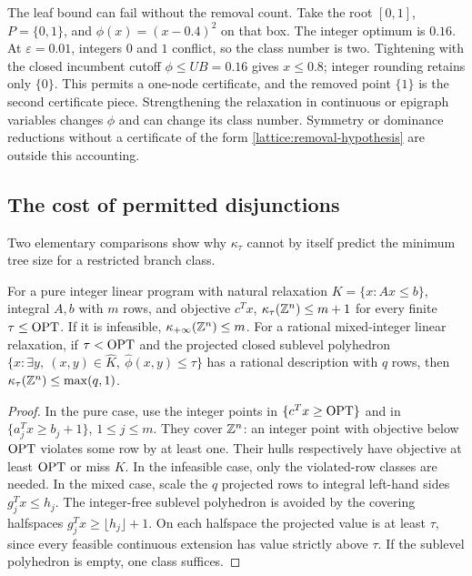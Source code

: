 The leaf bound can fail without the removal count. Take the root
$[0,1]$, $P=\{0,1\}$, and $\phi(x)=(x-0.4)^2$ on that box. The integer
optimum is $0.16$. At $\varepsilon=0.01$, integers $0$ and $1$ conflict,
so the class number is two. Tightening with the closed incumbent cutoff
$\phi\le UB=0.16$ gives $x\le0.8$; integer rounding retains only
$\{0\}$. This permits a one-node certificate, and the removed point
$\{1\}$ is the second certificate piece. Strengthening the relaxation in continuous or epigraph
variables changes $\phi$ and can change its class number. Symmetry or
dominance reductions without a certificate of the form
\eqref{lattice:removal-hypothesis} are outside this accounting.

\subsection{The cost of permitted disjunctions}

Two elementary comparisons show why $\kappa_\tau$ cannot by itself predict
the minimum tree size for a restricted branch class.

\begin{proposition}
\label{lattice:linear}
For a pure integer linear program with natural relaxation
$K=\{x:Ax\le b\}$, integral $A,b$ with $m$ rows, and objective $c^Tx$,
$\kappa_\tau(\mathbb{Z}^n)\le m+1$ for every finite $\tau\le\operatorname{OPT}$. If it is
infeasible, $\kappa_{+\infty}(\mathbb{Z}^n)\le m$. For a rational mixed-integer
linear relaxation, if $\tau<\operatorname{OPT}$ and the projected closed sublevel
polyhedron $\{x:\exists y,\ (x,y)\in\widehat K,
\ \widehat\phi(x,y)\le\tau\}$ has a rational description with $q$ rows,
then $\kappa_\tau(\mathbb{Z}^n)\le\max(q,1)$.
\end{proposition}

\begin{proof}
In the pure case, use the integer points in
$\{c^Tx\ge\operatorname{OPT}\}$ and in $\{a_j^Tx\ge b_j+1\}$, $1\le j\le m$.
They cover $\mathbb{Z}^n$: an integer point with objective below $\operatorname{OPT}$ violates
some row by at least one. Their hulls respectively have objective at least
$\operatorname{OPT}$ or miss $K$. In the infeasible case, only the violated-row classes
are needed. In the mixed case, scale the $q$ projected rows to integral
left-hand sides $g_j^Tx\le h_j$. The integer-free sublevel polyhedron is
avoided by the covering halfspaces
$g_j^Tx\ge\lfloor h_j\rfloor+1$. On each halfspace the projected value is
at least $\tau$, since every feasible continuous extension has value
strictly above $\tau$. If the sublevel polyhedron is empty, one class
suffices.
\end{proof}

